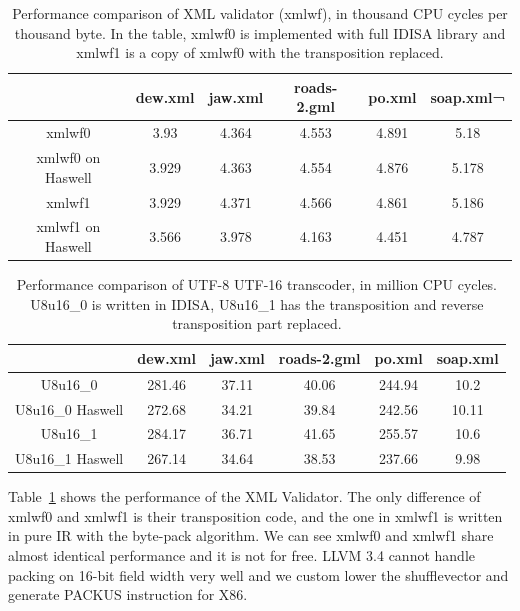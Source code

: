\begin{table}[h]
\centering
\begin{tabular}{|c|c|c|c|c|c|}
\hline
        & dew.xml  &  jaw.xml  &  roads-2.gml  &  po.xml  & soap.xml¬ \\\hline
xmlwf0   &  3.93   &    4.364   &   4.553   &   4.891   &   5.18 \\ \hline
xmlwf0 on Haswell   &  3.929   &   4.363   &   4.554   &   4.876   &   5.178 \\ \hline

xmlwf1   &  3.929   &   4.371   &   4.566   &   4.861   &   5.186 \\ \hline
xmlwf1 on Haswell &   3.566   &   3.978   &   4.163   &   4.451   &   4.787 \\ \hline
\end{tabular}
\caption[Performance Comparison of XML Validator (xmlwf)]{Performance comparison of XML validator (xmlwf), in thousand CPU cycles per thousand byte. In the table, xmlwf0 is implemented with full IDISA library and xmlwf1 is a copy of xmlwf0 with the transposition replaced.}
\label{table:xmlwf_perf}
\end{table}

\begin{table}[h]
\centering
\begin{tabular}{|c|c|c|c|c|c|}
\hline
 & dew.xml & jaw.xml & roads-2.gml & po.xml & soap.xml \\ \hline
 U8u16\_0         & 281.46  & 37.11   & 40.06       & 244.94 & 10.2     \\ \hline
 U8u16\_0 Haswell & 272.68  & 34.21   & 39.84       & 242.56 & 10.11    \\ \hline
 U8u16\_1         & 284.17  & 36.71   & 41.65       & 255.57 & 10.6     \\ \hline
 U8u16\_1 Haswell & 267.14  & 34.64   & 38.53       & 237.66 & 9.98     \\ \hline
 \end{tabular}
 \caption[Performance Comparison of UTF-8 UTF-16 Transcoder]{Performance comparison of UTF-8 UTF-16 transcoder, in million CPU cycles. U8u16\_0 is written in IDISA, U8u16\_1 has the transposition and reverse transposition part replaced.}
 \label{table:u8u16_perf}
 \end{table}

Table~\ref{table:xmlwf_perf} shows the performance of the XML Validator. The only difference of xmlwf0 and xmlwf1 is their transposition code, and the one in xmlwf1 is written in pure IR with the byte-pack algorithm. We can see xmlwf0 and xmlwf1 share almost identical performance and it is not for free. LLVM 3.4 cannot handle packing on 16-bit field width very well and we custom lower the shufflevector and generate PACKUS instruction for X86.

